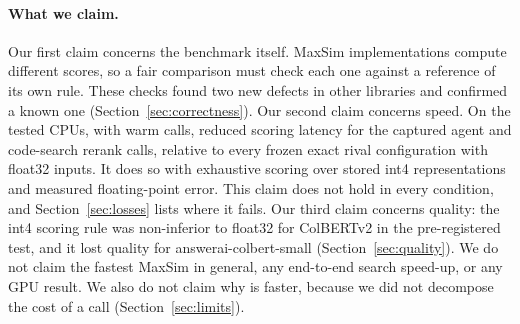 \paragraph{What we claim.}
Our first claim concerns the benchmark itself.
MaxSim implementations compute different scores, so a fair comparison must check each one against a reference of its own rule.
These checks found two new defects in other libraries and confirmed a known one (Section~\ref{sec:correctness}).
Our second claim concerns speed.
On the tested CPUs, with warm calls, \sweet reduced scoring latency for the captured agent and code-search rerank calls, relative to every frozen exact rival configuration with float32 inputs.
It does so with exhaustive scoring over stored int4 representations and measured floating-point error.
This claim does not hold in every condition, and Section~\ref{sec:losses} lists where it fails.
Our third claim concerns quality: the int4 scoring rule was non-inferior to float32 for ColBERTv2 in the pre-registered test, and it lost quality for answerai-colbert-small (Section~\ref{sec:quality}).
We do not claim the fastest MaxSim in general, any end-to-end search speed-up, or any GPU result.
We also do not claim why \sweet is faster, because we did not decompose the cost of a call (Section~\ref{sec:limits}).
